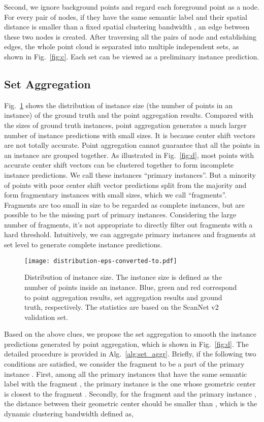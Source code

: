 \documentclass[10pt,twocolumn,letterpaper]{article}
\begin{document}
Second, we ignore background points and regard each foreground point as a node. For every pair of nodes, if they have the same semantic label and their spatial distance is smaller than a fixed spatial clustering bandwidth , an edge between these two nodes is created.
After traversing all the pairs of node and establishing edges, the whole point cloud is separated into multiple independent sets, as shown in Fig.~\ref{fig:c}. Each set can be viewed as a preliminary instance prediction.

\subsection{Set Aggregation}
\label{sec:set-aggr}
Fig.~\ref{fig:instance_size} shows the distribution of instance size (the number of points in an instance) of the ground truth and the point aggregation results. Compared with the sizes of ground truth instances, point aggregation generates a much larger number of instance predictions with small sizes. 
It is because center shift vectors are not totally accurate. Point aggregation cannot guarantee that all the points in an instance are grouped together. 
As illustrated in Fig.~\ref{fig:d}, most points with accurate center shift vectors can be clustered together to form incomplete instance predictions. We call these instances ``primary instances''.
But a minority of points with poor center shift vector predictions split from the majority and form fragmentary instances with small sizes, which we call ``fragments''.
Fragments are too small in size to be regarded as complete instances, but are possible to be the missing part of primary instances. Considering the large number of fragments, it's not appropriate to directly filter out fragments with a hard threshold. Intuitively, we can aggregate primary instances and fragments at set level to generate complete instance predictions.


\begin{figure}[thbp]
    \centering
    \texttt{[image: distribution-eps-converted-to.pdf]}
    \caption{Distribution of instance size. The instance size is defined as the number of points inside an instance. Blue, green and red correspond to point aggregation results, set aggregation results and ground truth, respectively. The statistics are based on the ScanNet v2~\cite{ScanNet} validation set.\label{fig:instance_size}}
\end{figure}

Based on the above clues, we propose the set aggregation to smooth the instance predictions generated by point aggregation, which is shown in Fig.~\ref{fig:d}. The detailed procedure is provided in Alg.~\ref{alg:set_aggr}.
Briefly, if the following two conditions are satisfied, we consider the fragment  to be a part of the primary instance .
First, among all the primary instances that have the same semantic label with the fragment , the primary instance  is the one whose geometric center is closest to the fragment . 
Secondly, for the fragment  and the primary instance , the distance between their geometric center should be smaller than , which is the dynamic clustering bandwidth defined as,
\end{document}
